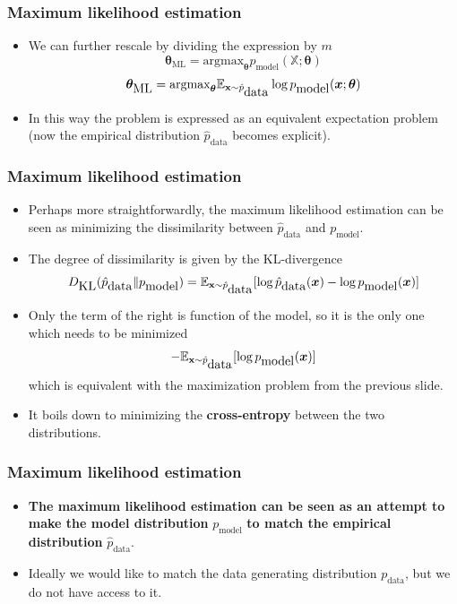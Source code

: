 \documentclass[notes]{beamer}          %
\newcommand{\vect}[1]{\bm{#1}}
\newcommand{\field}[1]{\mathbb{#1}}
\begin{document}
\begin{frame}
\frametitle{Maximum likelihood estimation}
    \begin{itemize}
        \item We can further rescale by dividing the expression by $m$
        $$
        \vect{\theta}_{\mbox{ML}} = \mbox{argmax}_{\vect{\theta}} p_{\mbox{model}}(\field{X};\vect{\theta}) 
        $$
        $$
        \vect{\theta}_{\mbox{ML}} =  \mbox{argmax}_{\vect{\theta}} \field{E}_{\text{\bf x} \sim  \hat{p}_{\mbox{data}}} \log p_{\mbox{model}}(\vect{x};\vect{\theta})
        $$
        \item In this way the problem is expressed as an equivalent expectation problem (now the empirical distribution $\hat{p}_{\mbox{data}}$ becomes explicit).
    \end{itemize}
\end{frame}


\begin{frame}
\frametitle{Maximum likelihood estimation}
    \begin{itemize}
        \item Perhaps more straightforwardly, the maximum likelihood estimation can be seen as minimizing the dissimilarity between $\hat{p}_{\mbox{data}}$ and $p_{\mbox{model}}$.
        \item The degree of dissimilarity is given by the KL-divergence
        $$
        D_{\mbox{KL}} (\hat{p}_{\mbox{data}} \lVert p_{\mbox{model}}) = \field{E}_{\text{\bf x} \sim  \hat{p}_{\mbox{data}}} [\log \hat{p}_{\mbox{data}}(\vect{x}) - \log p_{\mbox{model}}(\vect{x})]
        $$
        \item Only the term of the right is function of the model, so it is the only one which needs to be minimized
        $$
        - \field{E}_{\text{\bf x} \sim  \hat{p}_{\mbox{data}}} [\log p_{\mbox{model}}(\vect{x})]
        $$
        which is equivalent with the maximization problem from the previous slide.
        \item It boils down to minimizing the {\bf cross-entropy} between the two distributions.
    \end{itemize}
\end{frame}


\begin{frame}
\frametitle{Maximum likelihood estimation}
    \begin{itemize}
        \item {\bf The maximum likelihood estimation can be seen as an attempt to make the model distribution } $p_{\mbox{model}}$ {\bf to match the empirical distribution} $\hat{p}_{\mbox{data}}$.
        \item Ideally we would like to match the data generating distribution $p_{\mbox{data}}$, but we do not have access to it.
    \end{itemize}
\end{frame}
\end{document}
